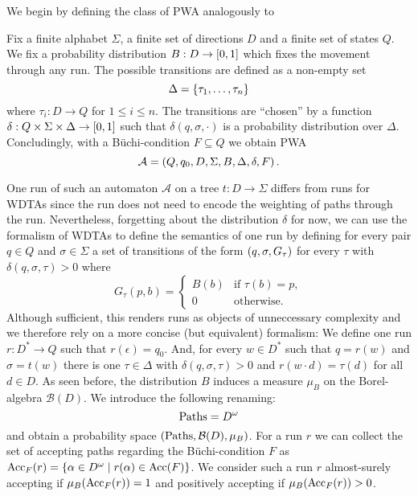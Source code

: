 We begin by defining the class of \ac{PWA} analogously to
\cite[Definition 4.1.1]{RandAutoInfTrees} 
\begin{definition}
  Fix a finite alphabet $\Sigma$, a finite set of directions $D$ and a finite
  set of states $Q$. We fix a probability distribution
  $B:D\rightarrow\left[0,1\right]$ which fixes the movement through any run. The
  possible transitions are defined as a non-empty set
  \begin{equation*}
    \Delta = \left\{\tau_{1},\dots,\tau_{n}\right\}
  \end{equation*}
  where $\tau_{i}:D\rightarrow Q$ for $1\leq i\leq n$.
  The transitions are \enquote{chosen} by a function 
  $\delta:Q\times\Sigma\times\Delta\rightarrow\left[0,1\right]$ such that
  $\delta(q,\sigma,\cdot)$ is a probability distribution over $\Delta$.
  Concludingly, with a Büchi-condition $F\subseteq Q$ we obtain \ac{PWA}
  \begin{equation*}
    \mathcal{A} = \left(Q, q_{0}, D, \Sigma, B, \Delta, \delta, F\right).
  \end{equation*}
\end{definition}
One run of such an automaton $\mathcal{A}$ on a tree $t:D\rightarrow\Sigma$
differs from runs for \acp{WDTA} since the run does not need to encode the
weighting of paths through the run. Nevertheless, forgetting about the
distribution $\delta$ for now, we can use the formalism of \acp{WDTA} to define
the semantics of one run by defining for every pair $q\in Q$ and
$\sigma\in\Sigma$ a set of transitions of the form $\left(q,\sigma,G_{\tau}\right)$
for every $\tau$ with $\delta(q,\sigma,\tau)>0$ where
\begin{equation*}
  G_{\tau}(p,b) = \begin{cases}
    B(b)&\text{if }\tau(b) = p,\\
    0&\text{otherwise}.
  \end{cases}
\end{equation*}
Although sufficient, this renders runs as objects of unneccessary complexity
and we therefore rely on a more concise (but equivalent) formalism:
We define one run $r:D^{*}\rightarrow Q$ such that $r(\epsilon) = q_{0}$. And, 
for every $w\in D^{*}$ such that $q = r(w)$ and $\sigma = t(w)$ there is one
$\tau\in\Delta$ with $\delta(q,\sigma,\tau)>0$ and $r(w\cdot d)=\tau(d)$ 
for all $d\in D$. As seen before, the distribution $B$ induces a measure
$\mu_{B}$ on the Borel-algebra $\mathcal{B}(D)$. We introduce the following
renaming:
\begin{equation*}
  \operatorname{Paths} = D^{\omega}
\end{equation*}
and obtain a probability space $\left(\operatorname{Paths}, \mathcal{B}(D), \mu_{B}\right)$. For a
run $r$ we can collect the set of accepting paths regarding the Büchi-condition
$F$ as $\operatorname{Acc}_{F}(r) = \left\{\alpha\in D^{\omega}\mid r(\alpha)\in \operatorname{Acc}(F)\right\}$. We
consider such a run $r$ almost-surely accepting if $\mu_{B}(\operatorname{Acc}_{F}(r))=1$ and 
positively accepting if $\mu_{B}(\operatorname{Acc}_{F}(r))>0$.

